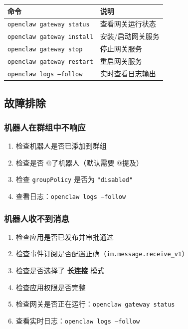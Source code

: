 \begin{table}[h]
\centering
\small
\begin{tabular}{|l|l|}
\hline
命令 & 说明 \\
\hline
\texttt{openclaw gateway status} & 查看网关运行状态 \\
\hline
\texttt{openclaw gateway install} & 安装/启动网关服务 \\
\hline
\texttt{openclaw gateway stop} & 停止网关服务 \\
\hline
\texttt{openclaw gateway restart} & 重启网关服务 \\
\hline
\texttt{openclaw logs --follow} & 实时查看日志输出 \\
\hline
\end{tabular}
\end{table}



\hrulefill


\subsection{故障排除}


\subsubsection{机器人在群组中不响应}


\begin{enumerate}
  \item 检查机器人是否已添加到群组
  \item 检查是否 @了机器人（默认需要 @提及）
  \item 检查 \texttt{groupPolicy} 是否为 \texttt{"disabled"}
  \item 查看日志：\texttt{openclaw logs --follow}
\end{enumerate}


\subsubsection{机器人收不到消息}


\begin{enumerate}
  \item 检查应用是否已发布并审批通过
  \item 检查事件订阅是否配置正确（\texttt{im.message.receive\_v1}）
  \item 检查是否选择了 \textbf{长连接} 模式
  \item 检查应用权限是否完整
  \item 检查网关是否正在运行：\texttt{openclaw gateway status}
  \item 查看实时日志：\texttt{openclaw logs --follow}
\end{enumerate}


